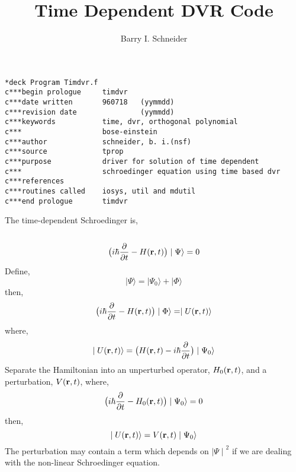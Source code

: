 \documentclass{article}
\title{Time Dependent DVR Code}
\author{Barry I. Schneider}
\date{}
\def \>{\rangle}
\begin{document}
 \maketitle
\begin{verbatim}
*deck Program Timdvr.f 
c***begin prologue     timdvr
c***date written       960718   (yymmdd)
c***revision date               (yymmdd)
c***keywords           time, dvr, orthogonal polynomial
c***                   bose-einstein
c***author             schneider, b. i.(nsf)
c***source             tprop
c***purpose            driver for solution of time dependent
c***                   schroedinger equation using time based dvr
c***references
c***routines called    iosys, util and mdutil
c***end prologue       timdvr
\end{verbatim}
 The time-dependent Schroedinger is,
\begin{verbatim}\end{verbatim}
 \begin{equation}
 \big( i \hbar { \partial \over \partial t } - 
            H({\bf r},t) \big) \mid \Psi \> = 0  
 \end{equation}
 Define,
 \begin{equation}
     \mid \Psi \> = \mid \Psi_{0} \>+ \mid \Phi \> 
 \end{equation}
 then,
 \begin{equation}
    \big( i \hbar { \partial \over \partial t } 
                - H({\bf r},t)\big) \mid \Phi \> = \mid U({\bf r},t) \>
 \end{equation}
 where,
 \begin{equation}
  \mid U({\bf r},t) \> = \big( H({\bf r},t) 
                              - i \hbar{ \partial \over \partial t }  \big) 
                                 \mid \Psi_{0} \>
 \end{equation}
 Separate the Hamiltonian into an unperturbed operator, 
 $H_{0}({\bf r},t)$, and a perturbation, $V({\bf r},t)$, where,
 \begin{equation}
 \big( i \hbar { \partial \over \partial t } 
               - H_{0}({\bf r},t) \big) \mid \Psi_{0} \> 
                     = 0  
 \end{equation}
 then,
 \begin{equation}
 \mid U({\bf r},t) \> =  V({\bf r},t) \mid \Psi_{0} \>
 \end{equation}
 The perturbation may contain a term which depends on ${ {\mid \Psi \mid}^2 }$
 if we are dealing with the non-linear Schroedinger equation.
\end{document}
